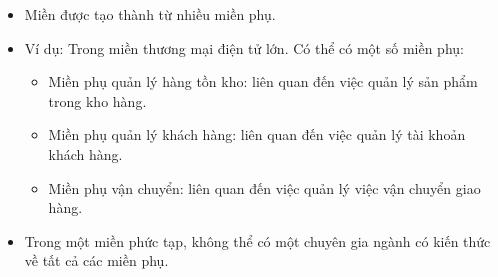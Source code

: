 \begin{itemize}

    \item Miền được tạo thành từ nhiều miền phụ.

    \item Ví dụ: Trong miền thương mại điện tử lớn. Có thể có một số miền phụ:

          \begin{itemize}

              \item Miền phụ quản lý hàng tồn kho: liên quan đến việc quản lý sản phẩm trong kho hàng.

              \item Miền phụ quản lý khách hàng: liên quan đến việc quản lý tài khoản khách hàng.

              \item Miền phụ vận chuyển: liên quan đến việc quản lý việc vận chuyển giao hàng.

          \end{itemize}

    \item Trong một miền phức tạp, không thể có một chuyên gia ngành có kiến thức về tất cả các miền phụ.


\end{itemize}